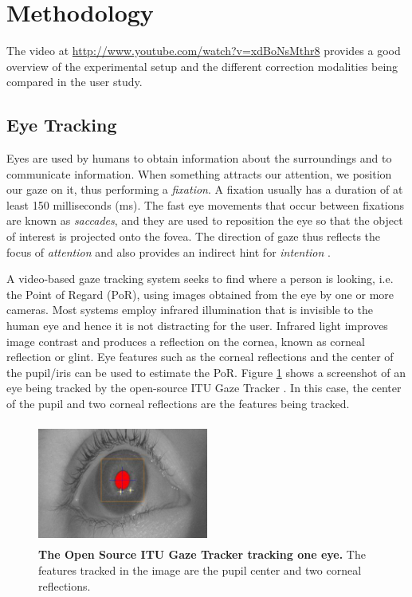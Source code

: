 \documentclass[]{article}
\begin{document}
\section{Methodology}
The video at \url{http://www.youtube.com/watch?v=xdBoNsMthr8} provides a good overview of the
experimental setup and the different correction modalities being compared in the user study.

\subsection{Eye Tracking}
Eyes are used by humans to obtain information about the surroundings and to
communicate information. When something attracts our attention, we position our
gaze on it, thus performing a \textit{fixation}. A fixation usually has a
duration of at least 150 milliseconds (ms). The fast eye movements that
occur between fixations are known as \textit{saccades}, and they are used to
reposition the eye so that the object of interest is projected onto the fovea.
The direction of gaze thus reflects the focus of 
\textit{attention} and also provides an indirect hint for \textit{intention}
\cite{velichkovsky}.


A video-based gaze tracking system seeks to find where a person is looking, i.e.
the Point of Regard (PoR), using images obtained from the eye by one
or more cameras. Most systems employ infrared
illumination that is invisible to the human eye and hence it is not distracting
for the user. Infrared light improves image contrast and produces a reflection
on the cornea, known as corneal reflection or glint. Eye features such as the
corneal reflections and the center of the pupil/iris can be used to estimate the
PoR. Figure \ref{screenGazeTracker} shows a screenshot of an eye being tracked
by the open-source ITU Gaze Tracker \cite{lowcostitugazetracker,Rozado2012}. In this case,
the center of the pupil and two corneal reflections are the features being
tracked.


\begin{figure}[ht]
\begin{center}
\includegraphics[width=0.5\textwidth, height=40mm]{figures/screenGazeTracker.jpg}
\vspace{-3mm}
\end{center}
\caption{\textbf{The Open Source ITU Gaze Tracker tracking one eye.} The
features tracked in the image are the pupil center and two corneal reflections.}
\label{screenGazeTracker}
\end{figure}
\end{document}
